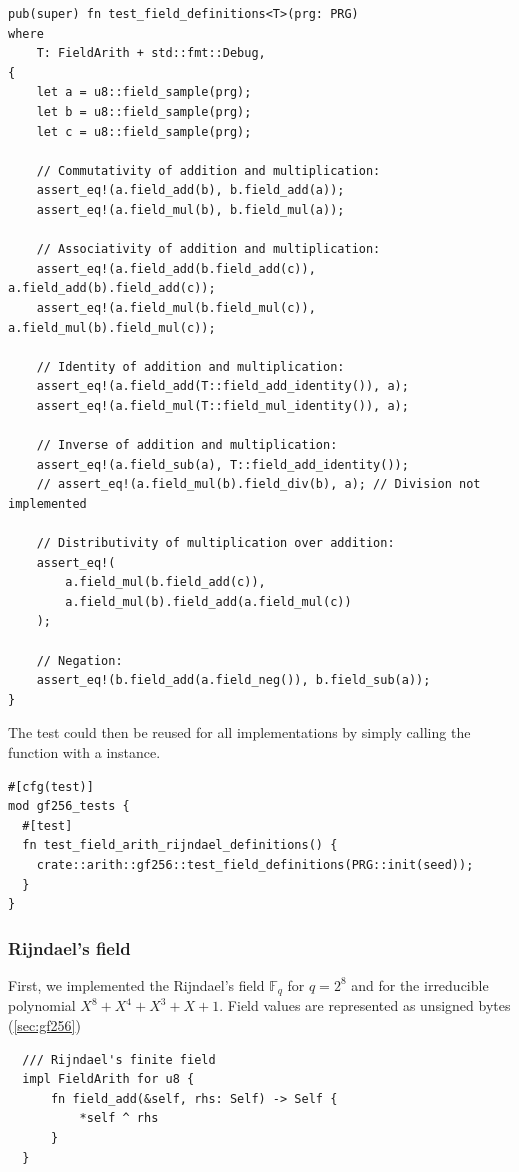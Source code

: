 \documentclass[11pt]{report}
\theoremstyle{definition}
\theoremstyle{plain}
\begin{document}
\begin{verbatim}
pub(super) fn test_field_definitions<T>(prg: PRG)
where
    T: FieldArith + std::fmt::Debug,
{
    let a = u8::field_sample(prg);
    let b = u8::field_sample(prg);
    let c = u8::field_sample(prg);

    // Commutativity of addition and multiplication:
    assert_eq!(a.field_add(b), b.field_add(a));
    assert_eq!(a.field_mul(b), b.field_mul(a));

    // Associativity of addition and multiplication:
    assert_eq!(a.field_add(b.field_add(c)), a.field_add(b).field_add(c));
    assert_eq!(a.field_mul(b.field_mul(c)), a.field_mul(b).field_mul(c));

    // Identity of addition and multiplication:
    assert_eq!(a.field_add(T::field_add_identity()), a);
    assert_eq!(a.field_mul(T::field_mul_identity()), a);

    // Inverse of addition and multiplication:
    assert_eq!(a.field_sub(a), T::field_add_identity());
    // assert_eq!(a.field_mul(b).field_div(b), a); // Division not implemented

    // Distributivity of multiplication over addition:
    assert_eq!(
        a.field_mul(b.field_add(c)),
        a.field_mul(b).field_add(a.field_mul(c))
    );

    // Negation:
    assert_eq!(b.field_add(a.field_neg()), b.field_sub(a));
}
\end{verbatim}

The test could then be reused for all  implementations by simply calling the  function with a  instance.

\begin{verbatim}
#[cfg(test)]
mod gf256_tests {
  #[test]
  fn test_field_arith_rijndael_definitions() {
    crate::arith::gf256::test_field_definitions(PRG::init(seed));
  }
}
\end{verbatim}

\subsubsection{Rijndael's field}\label{sub:rijndael_field}

First, we implemented the Rijndael's field $\mathbb{F}_{q}$ for $q=2^8$ and for the irreducible polynomial $X^8 + X^4 + X^3 + X + 1$. Field values are represented as unsigned bytes  (\autoref{sec:gf256})
\begin{verbatim}
  /// Rijndael's finite field 
  impl FieldArith for u8 {
      fn field_add(&self, rhs: Self) -> Self {
          *self ^ rhs
      }
  }
\end{verbatim}
\end{document}
